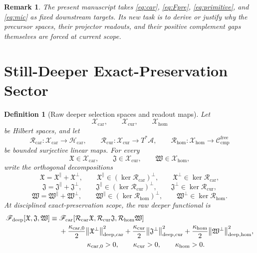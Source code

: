 \documentclass[11pt]{article}
\newcommand{\Sub}{\mathcal A}
\newcommand{\CompFree}{\mathscr C_{\mathrm{cmp}}^{\mathrm{free}}}
\newcommand{\CarrierFunctional}{\mathscr F_{\mathrm{car}}}
\newcommand{\DeepFunctional}{\mathscr F_{\mathrm{deep}}}
\newcommand{\CarrierClass}{\mathscr H_{\mathrm{car}}}
\newcommand{\PreCarGap}{\kappa_{\mathrm{car},0}}
\newcommand{\CurrentGap}{\kappa_{\mathrm{cur}}}
\newcommand{\HomGap}{\kappa_{\mathrm{hom}}}
\newcommand{\DeepTensorClass}{\mathscr X_{\mathrm{car}}}
\newcommand{\DeepRelabelClass}{\mathscr X_{\mathrm{cur}}}
\newcommand{\DeepFreeClass}{\mathscr X_{\mathrm{hom}}}
\newcommand{\DeepTensor}{\mathfrak X}
\newcommand{\DeepRelabel}{\mathfrak J}
\newcommand{\DeepFree}{\mathfrak W}
\newcommand{\CarRead}{\mathcal R_{\mathrm{car}}}
\newcommand{\CurRead}{\mathcal R_{\mathrm{cur}}}
\newcommand{\HomRead}{\mathcal R_{\mathrm{hom}}}
\newtheorem{definition}{Definition}
\newtheorem{remark}{Remark}
\begin{document}
\begin{remark}
The present manuscript takes \eqref{eq:car}, \eqref{eq:Fpre}, \eqref{eq:primitive}, and \eqref{eq:mic} as fixed downstream targets. Its new task is to derive or justify why the precursor spaces, their projector readouts, and their positive complement gaps themselves are forced at current scope.
\end{remark}

\section{Still-Deeper Exact-Preservation Sector}

\begin{definition}[Raw deeper selection spaces and readout maps]
\label{def:deep}
Let
\[
\DeepTensorClass,\qquad
\DeepRelabelClass,\qquad
\DeepFreeClass
\]
be Hilbert spaces, and let
\begin{equation}
\CarRead:\DeepTensorClass\to\CarrierClass,
\qquad
\CurRead:\DeepRelabelClass\to T^*\Sub,
\qquad
\HomRead:\DeepFreeClass\to\CompFree
\label{eq:maps}
\end{equation}
be bounded surjective linear maps. For every
\[
\DeepTensor\in\DeepTensorClass,\qquad
\DeepRelabel\in\DeepRelabelClass,\qquad
\DeepFree\in\DeepFreeClass,
\]
write the orthogonal decompositions
\begin{equation}
\DeepTensor=\DeepTensor^{\parallel}+\DeepTensor^{\perp},
\qquad
\DeepTensor^{\parallel}\in(\ker\CarRead)^\perp,
\qquad
\DeepTensor^{\perp}\in\ker\CarRead,
\label{eq:Xsplit}
\end{equation}
\begin{equation}
\DeepRelabel=\DeepRelabel^{\parallel}+\DeepRelabel^{\perp},
\qquad
\DeepRelabel^{\parallel}\in(\ker\CurRead)^\perp,
\qquad
\DeepRelabel^{\perp}\in\ker\CurRead,
\label{eq:Jsplit}
\end{equation}
\begin{equation}
\DeepFree=\DeepFree^{\parallel}+\DeepFree^{\perp},
\qquad
\DeepFree^{\parallel}\in(\ker\HomRead)^\perp,
\qquad
\DeepFree^{\perp}\in\ker\HomRead.
\label{eq:Wsplit}
\end{equation}
At disciplined exact-preservation scope, the raw deeper functional is
\begin{equation}
\begin{aligned}
\DeepFunctional[\DeepTensor,\DeepRelabel,\DeepFree]
\equiv\;
&\CarrierFunctional[\CarRead\DeepTensor,\CurRead\DeepRelabel,\HomRead\DeepFree]
\\
&+\frac{\PreCarGap}{2}\norm{\DeepTensor^{\perp}}_{\mathrm{deep,car}}^2
+\frac{\CurrentGap}{2}\norm{\DeepRelabel^{\perp}}_{\mathrm{deep,cur}}^2
+\frac{\HomGap}{2}\norm{\DeepFree^{\perp}}_{\mathrm{deep,hom}}^2,
\\
&\qquad\qquad
\PreCarGap>0,\qquad
\CurrentGap>0,\qquad
\HomGap>0.
\end{aligned}
\label{eq:Fdeep}
\end{equation}
\end{definition}
\end{document}
